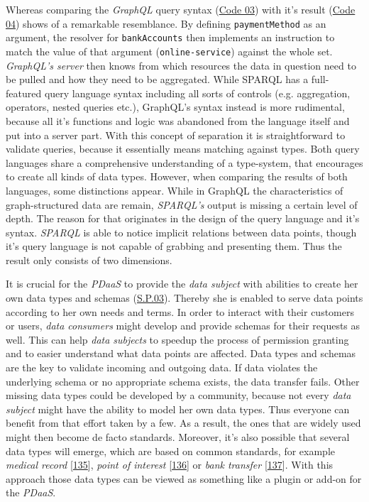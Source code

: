 \documentclass[12pt,english,a4paper,titlepage,cleardoublepage=empty,dottedtoc]{report}
\begin{document}
Whereas comparing the \emph{GraphQL} query syntax
(\protect\hyperlink{code-03_graphql-query}{Code 03}) with it's result
(\protect\hyperlink{code-04_graphql-query-result}{Code 04}) shows of a
remarkable resemblance. By defining \texttt{paymentMethod} as an
argument, the resolver for \texttt{bankAccounts} then implements an
instruction to match the value of that argument
(\texttt{\textquotesingle{}online-service\textquotesingle{}}) against
the whole set. \emph{GraphQL's server} then knows from which resources
the data in question need to be pulled and how they need to be
aggregated. While SPARQL has a full-featured query language syntax
including all sorts of controls (e.g. aggregation, operators, nested
queries etc.), GraphQL's syntax instead is more rudimental, because all
it's functions and logic was abandoned from the language itself and put
into a server part. With this concept of separation it is
straightforward to validate queries, because it essentially means
matching against types. Both query languages share a comprehensive
understanding of a type-system, that encourages to create all kinds of
data types. However, when comparing the results of both languages, some
distinctions appear. While in GraphQL the characteristics of
graph-structured data are remain, \emph{SPARQL's} output is missing a
certain level of depth. The reason for that originates in the design of
the query language and it's syntax. \emph{SPARQL} is able to notice
implicit relations between data points, though it's query language is
not capable of grabbing and presenting them. Thus the result only
consists of two dimensions.

It is crucial for the \emph{PDaaS} to provide the \emph{data subject}
with abilities to create her own data types and schemas
(\protect\hyperlink{sp03}{S.P.03}). Thereby she is enabled to serve data
points according to her own needs and terms. In order to interact with
their customers or users, \emph{data consumers} might develop and
provide schemas for their requests as well. This can help \emph{data
subjects} to speedup the process of permission granting and to easier
understand what data points are affected. Data types and schemas are the
key to validate incoming and outgoing data. If data violates the
underlying schema or no appropriate schema exists, the data transfer
fails. Other missing data types could be developed by a community,
because not every \emph{data subject} might have the ability to model
her own data types. Thus everyone can benefit from that effort taken by
a few. As a result, the ones that are widely used might then become de
facto standards. Moreover, it's also possible that several data types
will emerge, which are based on common standards, for example
\emph{medical record}
{[}\protect\hyperlink{ref-web_spec_data-schemas_ehr}{135}{]},
\emph{point of interest}
{[}\protect\hyperlink{ref-web_spec_data-schemas_poi}{136}{]} or
\emph{bank transfer}
{[}\protect\hyperlink{ref-web_spec_data-schemas_bank-transfer}{137}{]}.
With this approach those data types can be viewed as something like a
plugin or add-on for the \emph{PDaaS}.
\end{document}
